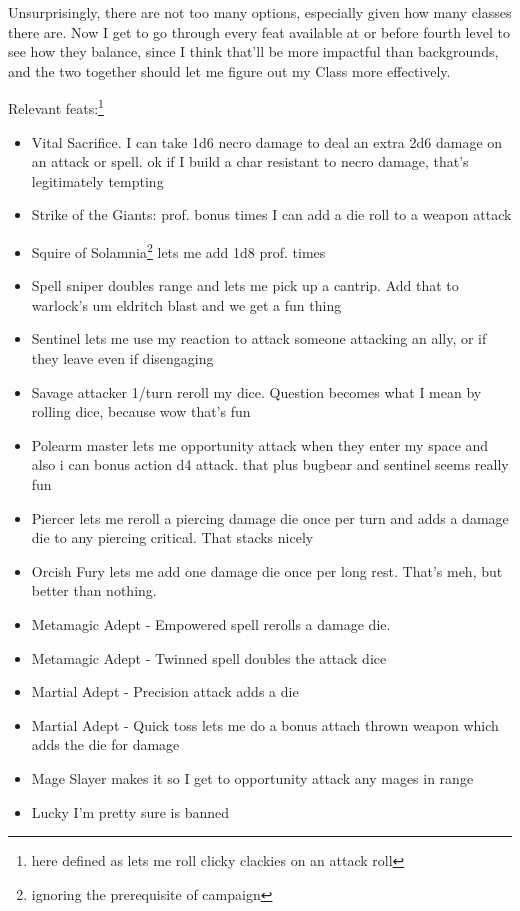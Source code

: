 \documentclass[12pt]{article}[titlepage]
\renewcommand{\,}{\textsuperscript{,}}
\begin{document}
Unsurprisingly, there are not too many options, especially given how many classes there are.
Now I get to go through every feat available at or before fourth level to see how they balance, since I think that'll be more impactful than backgrounds, and the two together should let me figure out my Class more effectively.

Relevant feats:\footnote{here defined as lets me roll clicky clackies on an attack roll}
\begin{itemize}
\item Vital Sacrifice. I can take 1d6 necro damage to deal an extra 2d6 damage on an attack or spell. ok if I build a char resistant to necro damage, that's legitimately tempting
\item Strike of the Giants: prof. bonus times I can add a die roll to a weapon attack
\item Squire of Solamnia\footnote{ignoring the prerequisite of campaign} lets me add 1d8 prof. times
\item Spell sniper doubles range and lets me pick up a cantrip. Add that to warlock's um eldritch blast and we get a fun thing
\item Sentinel lets me use my reaction to attack someone attacking an ally, or if they leave even if disengaging
\item Savage attacker 1/turn reroll my dice. Question becomes what I mean by rolling dice, because wow that's fun
\item Polearm master lets me opportunity attack when they enter my space and also i can bonus action d4 attack. that plus bugbear and sentinel seems really fun
\item Piercer lets me reroll a piercing damage die once per turn and adds a damage die to any piercing critical.
That stacks nicely
\item Orcish Fury lets me add one damage die once per long rest. That's meh, but better than nothing.
\item Metamagic Adept - Empowered spell rerolls a damage die.
\item Metamagic Adept - Twinned spell doubles the attack dice
\item Martial Adept - Precision attack adds a die
\item Martial Adept - Quick toss lets me do a bonus attach thrown weapon which adds the die for damage
\item Mage Slayer makes it so I get to opportunity attack any mages in range
\item Lucky I'm pretty sure is banned

\end{itemize}
\end{document}
